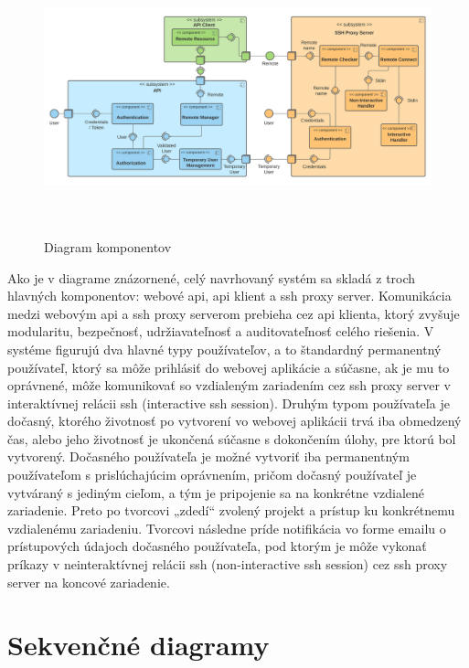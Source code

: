\begin{figure}[H]
\begin{center}\includegraphics[width=\textwidth,height=8cm,keepaspectratio=true]{assets/diagram_komponentov.png}\end{center}
\caption[Diagram komponentov]{Diagram komponentov}\label{fig:obr_9}
\end{figure}

Ako je v diagrame znázornené, celý navrhovaný systém sa skladá z troch hlavných komponentov: webové api, api klient a ssh proxy server.
Komunikácia medzi webovým api a ssh proxy serverom prebieha cez api klienta, ktorý zvyšuje modularitu, bezpečnosť, udržiavateľnosť a
auditovateľnosť celého riešenia.
V systéme figurujú dva hlavné typy používateľov, a to štandardný permanentný používateľ, ktorý sa môže prihlásiť do webovej
aplikácie a súčasne, ak je mu to oprávnené, môže komunikovať so vzdialeným zariadením cez ssh proxy server v interaktívnej
relácii ssh (interactive ssh session).
Druhým typom používateľa je dočasný, ktorého životnosť po vytvorení vo webovej aplikácii trvá iba obmedzený čas, alebo jeho
životnosť je ukončená súčasne s dokončením úlohy, pre ktorú bol vytvorený.
Dočasného používateľa je možné vytvoriť iba permanentným používateľom s prislúchajúcim oprávnením, pričom dočasný
používateľ je vytváraný s jediným cieľom, a tým je pripojenie sa na konkrétne vzdialené zariadenie.
Preto po tvorcovi „zdedí“ zvolený projekt a prístup ku konkrétnemu vzdialenému zariadeniu.
Tvorcovi následne príde notifikácia vo forme emailu o prístupových údajoch dočasného používateľa, pod ktorým je môže vykonať príkazy
v neinteraktívnej relácii ssh (non-interactive ssh session) cez ssh proxy server na koncové zariadenie.

\section{Sekvenčné diagramy}\label{sec:sekvencne-diagramy}

